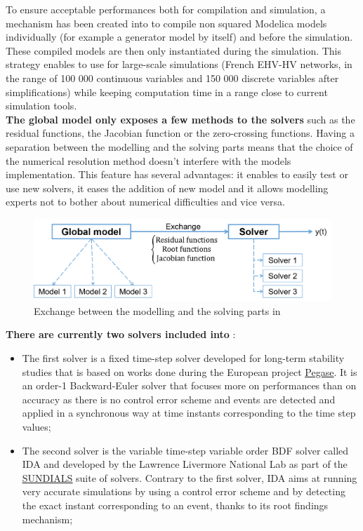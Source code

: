 \documentclass[a4paper, 12pt]{report}
\begin{document}
To ensure acceptable performances both for compilation and simulation, a mechanism has been created into \Dynawo to compile non squared Modelica models individually (for example a generator model by itself) and before the simulation. These compiled models are then only instantiated during the simulation. This strategy enables to use \Dynawo for large-scale simulations (French EHV-HV networks, in the range of 100 000 continuous variables and 150 000 discrete variables after simplifications) while keeping computation time in a range close to current simulation tools.\\

\textbf{The global model only exposes a few methods to the solvers} such as the residual functions, the Jacobian function or the zero-crossing functions. Having a separation between the modelling and the solving parts means that the choice of the numerical resolution method doesn't interfere with the models implementation. This feature has several advantages: it enables to easily test or use new solvers, it eases the addition of new model and it allows modelling experts not to bother about numerical difficulties and vice versa.

\begin{figure}[h!]
\centering
\includegraphics[width=\textwidth]{../resources/ExchangeModelSolver.png}
\caption{Exchange between the modelling and the solving parts in \Dynawo}
\end{figure}

\textbf{There are currently two solvers included into \Dynawo}:

\begin{itemize}
\item The first solver is a fixed time-step solver developed for long-term stability studies that is based on works done during the European project \href{http://www.fp7-pegase.com/}{\underline{Pegase}}. It is an order-1 Backward-Euler solver that focuses more on performances than on accuracy as there is no control error scheme and events are detected and applied in a synchronous way at time instants corresponding to the time step values;
\item The second solver is the variable time-step variable order BDF solver called IDA and developed by the Lawrence Livermore National Lab as part of the \href{https://computation.llnl.gov/projects/sundials}{\underline{SUNDIALS}} suite of solvers. Contrary to the first solver, IDA aims at running very accurate simulations by using a control error scheme and by detecting the exact instant corresponding to an event, thanks to its root findings mechanism;
\end{itemize}
\end{document}
